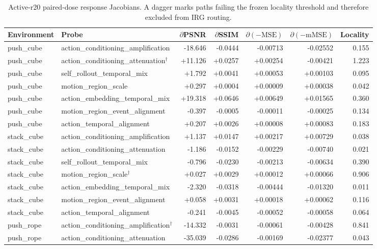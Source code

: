 \begin{table}[t]
\centering\scriptsize
\caption{Active-r20 paired-dose response Jacobians. A dagger marks paths failing the frozen locality threshold and therefore excluded from IRG routing.}
\label{tab:acwm_probe_jacobian}
\begin{tabular}{llrrrrr}
\toprule
Environment & Probe & $\partial$PSNR & $\partial$SSIM & $\partial(-\mathrm{MSE})$ & $\partial(-\mathrm{mMSE})$ & Locality \\
\midrule
push\_cube & action\_conditioning\_amplification & -18.646 & -0.0444 & -0.00713 & -0.02552 & 0.155 \\
push\_cube & action\_conditioning\_attenuation$^\dagger$ & +11.126 & +0.0257 & +0.00254 & -0.00421 & 1.223 \\
push\_cube & self\_rollout\_temporal\_mix & +1.792 & +0.0041 & +0.00053 & +0.00103 & 0.095 \\
push\_cube & motion\_region\_scale & +0.297 & +0.0004 & +0.00009 & +0.00038 & 0.042 \\
push\_cube & action\_embedding\_temporal\_mix & +19.318 & +0.0646 & +0.00649 & +0.01565 & 0.360 \\
push\_cube & motion\_region\_event\_alignment & -0.397 & -0.0005 & -0.00011 & -0.00025 & 0.134 \\
push\_cube & action\_temporal\_alignment & +0.207 & +0.0026 & +0.00008 & +0.00083 & 0.183 \\
stack\_cube & action\_conditioning\_amplification & +1.137 & +0.0147 & +0.00217 & +0.00729 & 0.038 \\
stack\_cube & action\_conditioning\_attenuation & -1.186 & -0.0152 & -0.00229 & -0.00740 & 0.021 \\
stack\_cube & self\_rollout\_temporal\_mix & -0.796 & -0.0230 & -0.00213 & -0.00634 & 0.390 \\
stack\_cube & motion\_region\_scale$^\dagger$ & +0.027 & +0.0029 & +0.00012 & +0.00066 & 0.906 \\
stack\_cube & action\_embedding\_temporal\_mix & -2.320 & -0.0318 & -0.00444 & -0.01320 & 0.011 \\
stack\_cube & motion\_region\_event\_alignment & +0.058 & +0.0031 & +0.00018 & +0.00062 & 0.116 \\
stack\_cube & action\_temporal\_alignment & -0.241 & -0.0045 & -0.00052 & -0.00058 & 0.064 \\
push\_rope & action\_conditioning\_amplification$^\dagger$ & -14.332 & -0.0031 & -0.00061 & -0.00428 & 0.841 \\
push\_rope & action\_conditioning\_attenuation & -35.039 & -0.0286 & -0.00169 & -0.02377 & 0.043 \\

\end{tabular}
\end{table}
